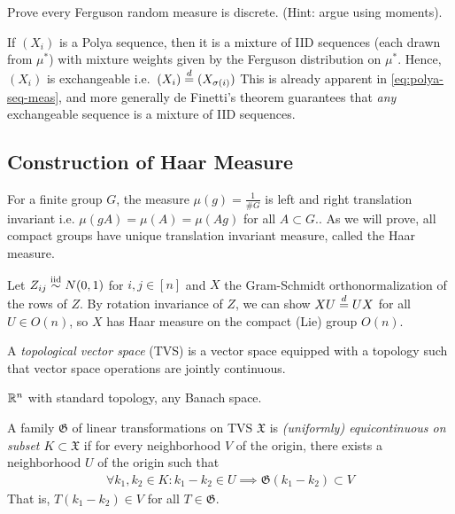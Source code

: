 \begin{exercise}
  Prove every Ferguson random measure is discrete.
  (Hint: argue using moments).
\end{exercise}


\begin{remark}
  If $(X_i)$ is a Polya sequence, then
  it is a mixture of IID sequences (each
  drawn from $\mu^*$) with mixture weights given by the Ferguson distribution
  on $\mu^*$. Hence, $(X_i)$ is exchangeable i.e.\ $(X_i) \overset{d}{=} (X_{\sigma(i)})$
  This is already apparent in \cref{eq:polya-seq-meas}, and more generally
  de Finetti's theorem guarantees that \emph{any} exchangeable sequence
  is a mixture of IID sequences.
\end{remark}

\subsection{Construction of Haar Measure}

For a finite group $G$, the measure $\mu(g) = \frac{1}{\# G}$ is
left and right translation invariant i.e. $\mu(gA) = \mu(A) = \mu(Ag)$
for all $A \subset G$..
As we will prove, all compact groups have unique translation invariant measure,
called the Haar measure.

\begin{example}
  Let $Z_{ij} \overset{\text{iid}}{\sim} N(0,1)$ for $i,j \in [n]$ and $X$ the Gram-Schmidt
  orthonormalization of the rows of $Z$.  By rotation invariance of $Z$, we can
  show $X U \overset{d}{=} U X$ for all $U \in O(n)$, so $X$ has Haar measure on the
  compact (Lie) group $O(n)$.
\end{example}


\begin{definition}
  A \emph{topological vector space} (TVS) is a vector space equipped with
  a topology such that vector space operations are jointly
  continuous.
\end{definition}

\begin{example}
  $\mathbb{R}^n$ with standard topology, any Banach space.
\end{example}

\begin{definition}
  \label{def:equicontinuous}
  A family $\mathfrak{G}$ of linear transformations on TVS
  $\mathfrak{X}$ is \emph{(uniformly) equicontinuous on subset $K \subset \mathfrak{X}$}
  if for every neighborhood $V$ of the origin, there exists a neighborhood
  $U$ of the origin such that
  \begin{align*}
    \forall k_1, k_2 \in K: k_1 - k_2 \in U \implies \mathfrak{G}(k_1 - k_2) \subset V
  \end{align*}
  That is, $T(k_1 - k_2) \in V$ for all $T \in \mathfrak{G}$.
\end{definition}

